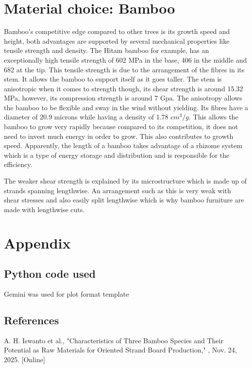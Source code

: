 \documentclass[11pt]{article}
\begin{document}
\section{Material choice: Bamboo}
Bamboo’s competitive edge compared to other trees is its growth speed and height, 
both advantages are supported by several mechanical properties like tensile strength and density. The Hitam bamboo for example, 
has an exceptionally high tensile strength of 602 MPa in the base, 406 in the middle and 682 at the tip. This tensile strength is due to the arrangement of the fibres in its stem. It allows the bamboo to support itself as it goes taller. 
The stem is anisotropic when it comes to strength though, its shear strength is around 15.32 MPa, however,  its compression strength is around 7 Gpa. The anisotropy allows the bamboo to be flexible and sway in the wind without yielding. Its fibres have a diameter of 20.9 microns while having a density of 1.78 $cm^3/g$. This allows the bamboo to grow very rapidly because compared to its competition, it does not need to invest much energy in order to grow. This also contributes to growth speed. Apparently, the length of a bamboo takes advantage of a rhizome system which is a type of energy storage and distribution and is responsible for the efficiency.

The weaker shear strength is explained by its microstructure which is made up of strands spanning lengthwise. An arrangement such as this is very weak with shear stresses and also easily split lengthwise which is why bamboo furniture are made with lengthwise cuts.

\newpage
\section{Appendix}
\subsection{Python code used}
Gemini was used for plot format template

\subsection{References}
A. H. Iswanto et al., "Characteristics of Three Bamboo Species and Their Potential as Raw Materials for Oriented Strand Board Production," 
, Nov. 24, 2025. [Online]
\end{document}
